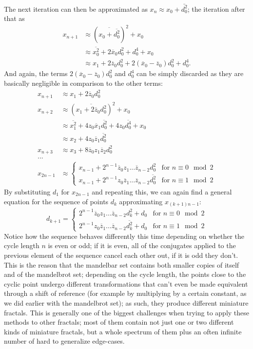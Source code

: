 \documentclass[12pt,a4paper]{article}
\newcommand{\eqar}[1]{\begin{align*} #1 \end{align*}}
\begin{document}
The next iteration can then be approximated as $x_n\approx x_0+\bar{d_0^2}$; the iteration after that as
\eqar{
	x_{n+1} &\approx (\overline{x_0+\overline{d_0^2}})^2+x_0\\
	&\approx \overline{x_0^2}+2\overline{x}_0d_0^2+d_0^4+x_0\\
	&\approx x_1+2\overline{z}_0d_0^2+2(\overline{x}_0-\overline{z}_0)d_0^2+d_0^4.
}
And again, the terms $2(\overline{x}_0-\overline{z}_0)d_0^2$ and $d_0^4$ can be simply discarded as they are basically negligible in comparison to the other terms:
\eqar{
	x_{n+1} &\approx x_1+2\overline{z}_0d_0^2\\
	x_{n+2} &\approx (\overline{x_1+2\overline{z}_0d_0^2})^2+x_0\\
	&\approx \overline{x_1^2}+4z_0\overline{x}_1\overline{d_0^2}+4z_0\overline{d_0^4}+x_0\\
	&\approx x_2+4z_0\overline{z}_1\overline{d_0^2}\\
	x_{n+3} &\approx x_3+8\overline{z}_0z_1\overline{z}_2d_0^2\\
	...\\
	x_{2n-1} &\approx \begin{cases}
		x_{n-1}+2^{n-1}\overline{z}_0z_1...\overline{z}_{n-2}d_0^2 & \text{for } n \equiv 0 \mod 2\\
		x_{n-1}+2^{n-1}z_0\overline{z}_1...\overline{z}_{n-2}\overline{d_0^2} & \text{for } n \equiv 1 \mod 2
	\end{cases}
}
By substituting $d_1$ for $x_{2n-1}$ and repeating this, we can again find a general equation for the sequence of points $d_k$ approximating $x_{(k+1)n-1}$:
$$d_{k+1} = \begin{cases}
2^{n-1}\overline{z}_0z_1...\overline{z}_{n-2}d_k^2+d_0 & \text{for } n \equiv 0 \mod 2\\
2^{n-1}z_0\overline{z}_1...\overline{z}_{n-2}\overline{d_k^2}+d_0 & \text{for } n \equiv 1 \mod 2
\end{cases}$$
Notice how the sequence behaves differently this time depending on whether the cycle length $n$ is even or odd; if it is even, all of the conjugates applied to the previous element of the sequence cancel each other out, if it is odd they don't. This is the reason that the mandelbar set contains both smaller copies of itself and of the mandelbrot set; depending on the cycle length, the points close to the cyclic point undergo different transformations that can't even be made equivalent through a shift of reference (for example by multiplying by a certain constant, as we did earlier with the mandelbrot set); as such, they produce different miniature fractals. This is generally one of the biggest challenges when trying to apply these methods to other fractals; most of them contain not just one or two different kinds of miniature fractals, but a whole spectrum of them plus an often infinite number of hard to generalize edge-cases.
\end{document}
